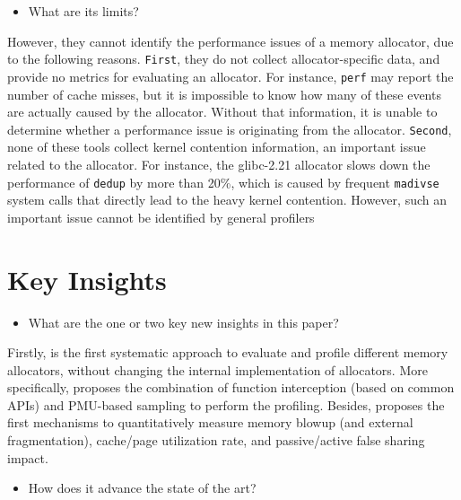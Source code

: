 \documentclass[pageno]{jpaper}
\begin{document}
\begin{itemize}
\item What are its limits?
\end{itemize}

\noindent
However, they cannot identify the performance issues of a memory allocator, due to the following reasons. \texttt{First}, they do not collect allocator-specific data, and provide no metrics for evaluating an allocator. For instance, \texttt{perf} may report the number of cache misses, but it is impossible to know how many of these events are actually caused by the allocator. Without that information, it is unable to determine whether a performance issue is originating from the allocator. \texttt{Second}, none of these tools collect kernel contention information, an important issue related to the allocator. For instance, the glibc-2.21 allocator slows down the performance of \texttt{dedup} by more than 20\%, which is caused by frequent \texttt{madivse} system calls that directly lead to the heavy kernel contention. However, such an important issue cannot be identified by general profilers~\cite{DBLP:conf/sigplan/GrahamKM82, Coz, perf}%


\section{Key Insights}
\label{sec:key-insights}

\begin{itemize}
\item What are the one or two key new insights in this paper?
\end{itemize}

\noindent
Firstly, \MP{} is the first systematic approach to evaluate and profile different memory allocators, without changing the internal implementation of allocators. More specifically, \MP{} proposes the combination of function interception (based on common APIs) and PMU-based sampling to perform the profiling. Besides, \MP{} proposes the first mechanisms to quantitatively measure memory blowup (and external fragmentation), cache/page utilization rate, and passive/active false sharing impact. 

\begin{itemize}
\item How does it advance the state of the art?
\end{itemize}
\end{document}
